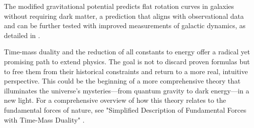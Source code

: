 \documentclass[a4paper,12pt]{article}
\begin{document}
	The modified gravitational potential predicts flat rotation curves in galaxies without requiring dark matter, a prediction that aligns with observational data and can be further tested with improved measurements of galactic dynamics, as detailed in \cite{pascher_galaxies_2025}.
	
	Time-mass duality and the reduction of all constants to energy offer a radical yet promising path to extend physics. The goal is not to discard proven formulas but to free them from their historical constraints and return to a more real, intuitive perspective. This could be the beginning of a more comprehensive theory that illuminates the universe's mysteries—from quantum gravity to dark energy—in a new light. For a comprehensive overview of how this theory relates to the fundamental forces of nature, see "Simplified Description of Fundamental Forces with Time-Mass Duality" \cite{pascher_grundkraefte_2025}.
	
\end{document}
